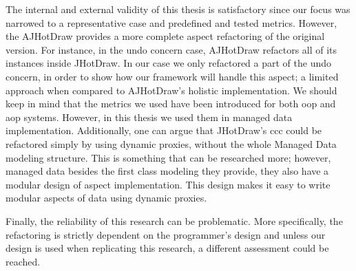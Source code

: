 The internal and external validity of this thesis is satisfactory since our focus was narrowed to a representative case and predefined and tested metrics.
However, the AJHotDraw provides a more complete aspect refactoring of the original version.
For instance, in the undo concern case, AJHotDraw refactors all of its instances inside JHotDraw. 
In our case we only refactored a part of the undo concern, in order to show how our framework will handle this aspect; a limited approach when compared to AJHotDraw's holistic implementation.
We should keep in mind that the metrics we used have been introduced for both \ac{oop} and \ac{aop} systems.
However, in this thesis we used them in managed data implementation. 
Additionally, one can argue that JHotDraw's \ac{ccc} could be refactored simply by using dynamic proxies, without the whole Managed Data modeling structure.
This is something that can be researched more; however, managed data besides the first class modeling they provide, they also have a modular design of aspect implementation.
This design makes it easy to write modular aspects of data using dynamic proxies.

Finally, the reliability of this research can be problematic.
More specifically, the refactoring is strictly dependent on the programmer's design and unless our design is used when replicating this research, a different assessment could be reached.
